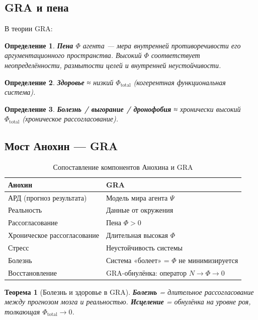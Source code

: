 \documentclass[11pt,a4paper]{article}
\newtheorem{theorem}{Теорема}
\newtheorem{definition}{Определение}
\begin{document}
\subsection{GRA и пена}

В теории GRA:

\begin{definition}
\textbf{Пена} $\Phi$ агента — мера внутренней противоречивости его аргументационного пространства. Высокий $\Phi$ соответствует неопределённости, размытости целей и внутренней неустойчивости.
\end{definition}

\begin{definition}
\textbf{Здоровье} ≈ низкий $\Phi_{\text{total}}$ (когерентная функциональная система).
\end{definition}

\begin{definition}
\textbf{Болезнь / выгорание / дронофобия} ≈ хронически высокий $\Phi_{\text{total}}$ (хроническое рассогласование).
\end{definition}

\subsection{Мост Анохин — GRA}

\begin{table}[h]
\centering
\caption{Сопоставление компонентов Анохина и GRA}
\begin{tabular}{ll}
\toprule
\textbf{Анохин} & \textbf{GRA} \\
\midrule
АРД (прогноз результата) & Модель мира агента $\Psi$ \\
Реальность & Данные от окружения \\
Рассогласование & Пена $\Phi > 0$ \\
Хроническое рассогласование & Длительная высокая $\Phi$ \\
Стресс & Неустойчивость системы \\
Болезнь & Система «болеет» = $\Phi$ не минимизируется \\
Восстановление & GRA-обнулёнка: оператор $N \to \Phi \to 0$ \\
\bottomrule
\end{tabular}
\end{table}

\begin{theorem}[Болезнь и здоровье в GRA]
\textbf{Болезнь} = длительное рассогласование между прогнозом мозга и реальностью.  
\textbf{Исцеление} = обнулёнка на уровне роя, толкающая $\Phi_{\text{total}} \to 0$.
\end{theorem}
\end{document}
